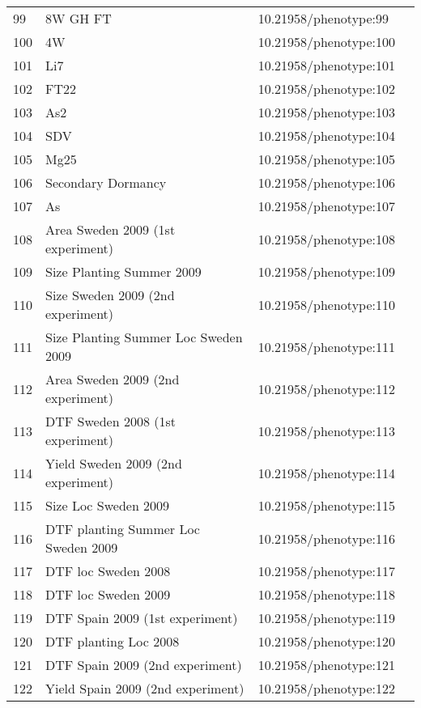 \begin{longtable}{p{} p{} p{} p{}}
 99 & 8W GH FT & 10.21958/phenotype:99 & \cite{atwell2010}\\
 100 & 4W & 10.21958/phenotype:100 & \cite{atwell2010}\\
 101 & Li7 & 10.21958/phenotype:101 & \cite{atwell2010}\\
 102 & FT22 & 10.21958/phenotype:102 & \cite{atwell2010}\\
 103 & As2 & 10.21958/phenotype:103 & \cite{atwell2010}\\
 104 & SDV & 10.21958/phenotype:104 & \cite{atwell2010}\\
 105 & Mg25 & 10.21958/phenotype:105 & \cite{atwell2010}\\
 106 & Secondary Dormancy & 10.21958/phenotype:106 & \cite{atwell2010}\\
 107 & As & 10.21958/phenotype:107 & \cite{atwell2010}\\
 108 & Area Sweden 2009 (1st experiment) & 10.21958/phenotype:108 & \cite{li2010}\\
 109 & Size Planting Summer 2009 & 10.21958/phenotype:109 & \cite{li2010}\\
 110 & Size Sweden 2009 (2nd experiment) & 10.21958/phenotype:110 & \cite{li2010}\\
 111 & Size Planting Summer Loc Sweden 2009 & 10.21958/phenotype:111 & \cite{li2010}\\
 112 & Area Sweden 2009 (2nd experiment) & 10.21958/phenotype:112 & \cite{li2010}\\
 113 & DTF Sweden 2008 (1st experiment) & 10.21958/phenotype:113 & \cite{li2010}\\
 114 & Yield Sweden 2009 (2nd experiment) & 10.21958/phenotype:114 & \cite{li2010}\\
 115 & Size Loc Sweden 2009 & 10.21958/phenotype:115 & \cite{li2010}\\
 116 & DTF planting Summer Loc Sweden 2009 & 10.21958/phenotype:116 & \cite{li2010}\\
 117 & DTF loc Sweden 2008 & 10.21958/phenotype:117 & \cite{li2010}\\
 118 & DTF loc Sweden 2009 & 10.21958/phenotype:118 & \cite{li2010}\\
 119 & DTF Spain 2009 (1st experiment) & 10.21958/phenotype:119 & \cite{li2010}\\
 120 & DTF planting Loc 2008 & 10.21958/phenotype:120 & \cite{li2010}\\
 121 & DTF Spain 2009 (2nd experiment) & 10.21958/phenotype:121 & \cite{li2010}\\
 122 & Yield Spain 2009 (2nd experiment) & 10.21958/phenotype:122 & \cite{li2010}\\

\end{longtable}
